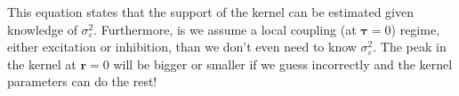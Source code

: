 \documentclass[]{article}
\begin{document}
This equation states that the support of the kernel can be estimated given knowledge of $\sigma_\varepsilon^2$. Furthermore, is we assume a local coupling (at $\boldsymbol\tau=0$) regime, either excitation or inhibition, than we don't even need to know $\sigma_\varepsilon^2$. The peak in the kernel at $\mathbf{r}=0$ will be bigger or smaller if we guess incorrectly and the kernel parameters can do the rest! 

\newpage
\end{document}
